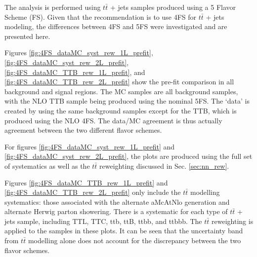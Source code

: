 %
The analysis is performed using $t\bar{t}$ + jets samples produced using a 5 Flavor Scheme (FS). Given that the recommendation is to use 4FS for $t\bar{t}$ + jets modeling, the differences between 4FS and 5FS were investigated and are presented here.

Figures \ref{fig:4FS_dataMC_syst_rew_1L_prefit}, \ref{fig:4FS_dataMC_syst_rew_2L_prefit}, \ref{fig:4FS_dataMC_TTB_rew_1L_prefit}, and \ref{fig:4FS_dataMC_TTB_rew_2L_prefit} show the pre-fit comparison in all background and signal regions. The MC samples are all background samples, with the NLO TTB sample being produced using the nominal 5FS. The `data' is created by using the same background samples except for the TTB, which is produced using the NLO 4FS. The data/MC agreement is thus actually agreement between the two different flavor schemes.

For figures \ref{fig:4FS_dataMC_syst_rew_1L_prefit} and \ref{fig:4FS_dataMC_syst_rew_2L_prefit}, the plots are produced using the full set of systematics as well as the $t\bar{t}$ reweighting discussed in Sec. \ref{sec:nn_rew}.

Figures \ref{fig:4FS_dataMC_TTB_rew_1L_prefit} and \ref{fig:4FS_dataMC_TTB_rew_2L_prefit} only include the $t\bar{t}$ modelling systematics: those associated with the alternate aMcAtNlo generation and alternate Herwig parton showering. There is a systematic for each type of $t\bar{t}$ + jets sample, including TTL, TTC, ttb, ttB, ttbb, and ttbbb. The $t\bar{t}$ reweighting is applied to the samples in these plots. It can be seen that the uncertainty band from $t\bar{t}$ modelling alone does not account for the discrepancy between the two flavor schemes. 


